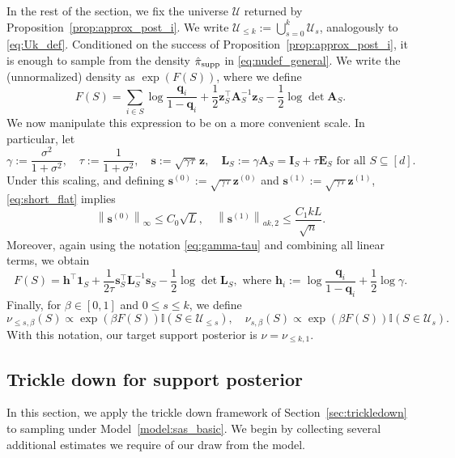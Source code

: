\documentclass[11pt]{article}
\newcommand{\defeq}{:=}
\newcommand{\norm}[1]{\left\lVert#1\right\rVert}
\newcommand{\1}{\mathbf{1}}
\newcommand{\0}{\mathbf{0}}
\newcommand{\ind}{\mathbb{I}}
\newcommand{\id}{\mathbf{I}}
\newcommand{\sig}{\sigma}
\newcommand{\vone}{\mathbf{1}}
\newcommand{\hpi}{\hat{\pi}}
\newcommand{\hpisupp}{\hpi_{\textup{supp}}}
\newcommand{\ma}{{\mathbf{A}}}
\newcommand{\me}{{\mathbf{E}}}
\newcommand{\ml}{{\mathbf{L}}}
\newcommand{\vh}{{\mathbf{h}}}
\newcommand{\vq}{{\mathbf{q}}}
\newcommand{\vs}{{\mathbf{s}}}
\newcommand{\vz}{{\mathbf{z}}}
\newcommand{\calU}{{\mathcal{U}}}
\begin{document}
In the rest of the section, we fix the universe $\calU$ returned by Proposition~\ref{prop:approx_post_i}. We write \(\calU_{\le k}\defeq\bigcup_{s=0}^k\calU_s\), analogously to \eqref{eq:Uk_def}. Conditioned on the success of Proposition~\ref{prop:approx_post_i}, it is enough to sample from
the density $\hpisupp$ in \eqref{eq:nudef_general}. 
We write the (unnormalized) density as $\exp(F(S))$, where we define
\[F(S)
    =
    \sum_{i\in S}\log\frac{\vq_i}{1-\vq_i}
    +
    \frac12\vz_S^\top\ma_S^{-1}\vz_S
    -
    \frac12\log\det\ma_S.\]
    We now manipulate this expression to be on a more convenient scale. In particular, let
    \begin{equation}\label{eq:gamma-tau}
    \gamma\defeq\frac{\sig^2}{1+\sig^2},
    \quad
    \tau\defeq\frac{1}{1+\sig^2},
    \quad
    \vs\defeq\sqrt{\gamma\tau}\,\vz,
    \quad
    \ml_S\defeq\gamma\ma_S=\id_S+\tau\me_S\text{ for all } S \subseteq [d].
\end{equation}
Under this scaling, and defining $\vs^{(0)} \defeq \sqrt{\gamma\tau}\vz^{(0)}$ and $\vs^{(1)} \defeq \sqrt{\gamma\tau}\vz^{(1)}$, \eqref{eq:short_flat} implies
\begin{equation}\label{eq:short_flat_scaled}
\norm{\vs^{(0)}}_\infty \le C_0 \sqrt{L},\quad \norm{\vs^{(1)}}_{ak, 2} \le \frac{C_1 k L }{\sqrt n}.
\end{equation}
Moreover, again using the notation \eqref{eq:gamma-tau} and combining all linear terms, we obtain
\begin{equation}\label{eq:slr-F-normalized}
    F(S)
    =
    \vh^\top\vone_S
    +
    \frac{1}{2\tau}\vs_S^\top\ml_S^{-1}\vs_S
    -
    \frac12\log\det\ml_S,
    \text{ where }
    \vh_i \defeq \log\frac{\vq_i}{1-\vq_i}+\frac12\log\gamma.
\end{equation}
Finally, for $\beta\in[0,1]$ and $0\le s\le k$, we define
\begin{equation}\label{eq:slr-tempered}
    \nu_{\le s,\beta}(S)
    \propto
    \exp(\beta F(S))\ind(S\in\calU_{\le s}),
    \quad
    \nu_{s,\beta}(S)
    \propto
    \exp(\beta F(S))\ind(S\in\calU_s).
\end{equation}
With this notation, our target support posterior is $\nu=\nu_{\le k,1}$. 

\subsection{Trickle down for support posterior}
\label{ssec:sample_exact}
In this section, we apply the trickle down framework of Section~\ref{sec:trickledown} to sampling under Model~\ref{model:sas_basic}.
We begin by collecting several additional estimates we require of our draw from the model.
\end{document}
